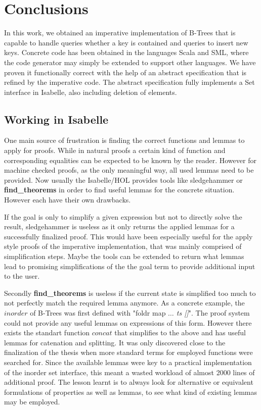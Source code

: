 

\chapter{Conclusions}\label{chapter:conclusion}

In this work, we obtained an imperative implementation
of B-Trees that is capable to handle queries whether a key is contained
and queries to insert new keys.
Concrete code has been obtained in the languages Scala and SML,
where the code generator may simply be extended to support other languages.
We have proven it functionally correct with the help of an abstract
specification that is refined by the imperative code.
The abstract specification fully implements
a Set interface in Isabelle, also including deletion of elements.


\section{Working in Isabelle}

One main source of frustration is finding the correct
functions and lemmas to apply for proofs.
While in natural proofs a certain kind of function and corresponding equalities can be
expected to be known by the reader.
However for machine checked proofs, as the only meaningful way,
all used lemmas need to be provided.
Now usually the Isabelle/HOL provides tools like sledgehammer
or \textbf{find\_theorems} in order to find useful lemmas for the concrete situation.
However each have their own drawbacks.

If the goal is only to simplify a given expression but not to
directly solve the result, sledgehammer is useless
as it only returns the applied lemmas for a successfully finalized proof.
This would have been especially useful for the apply style proofs of the
imperative implementation, that was mainly comprised of simplification steps.
Maybe the tools can be extended to return what lemmas lead to promising
simplifications of the the goal term to provide additional input to the user.

Secondly \textbf{find\_theorems} is useless if the current state
is simplified too much to not perfectly match the required lemma anymore.
As a concrete example, the $inorder$ of B-Trees was first defined
with "foldr map \textit{$\dots$ ts []}".
The proof system could not provide any useful lemmas on expressions of this form.
However there exists the standart function $concat$ that
simplifies to the above and has useful lemmas for catenation
and splitting.
It was only discovered close to the finalization of the thesis
when more standard terms for employed functions were searched for.
Since the available lemmas were key to a practical
implementation of the inorder set interface,
this meant a wasted workload of almost 2000 lines of additional proof.
The lesson learnt is to always look for alternative or equivalent
formulations of properties as well as lemmas,
to see what kind of existing lemmas may be employed.

